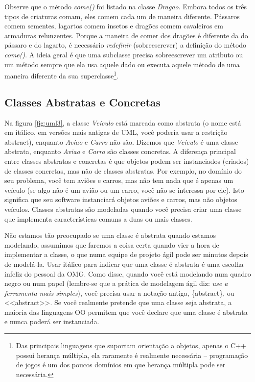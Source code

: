 \documentclass[
	article,			%
	12pt,				%
	openright,
	twoside,			%
	a4paper,			%
	english,			%
	french,
	brazil,				%
	sumario=tradicional
	]{abntex2}
\begin{document}
Observe que o método \emph{come()} foi listado na classe \emph{Dragao}. Embora todos os três tipos de criaturas comam, eles comem cada um de maneira diferente. Pássaros comem sementes, lagartos comem insetos e dragões comem cavaleiros em armaduras relunzentes. Porque a maneira de comer dos dragões é diferente da do pássaro e do lagarto, é necessário \textit{redefinir} (sobreescrever) a definição do método \emph{come()}. A ideia geral é que uma subclasse precisa sobreescrever um atributo ou um método sempre que ela usa aquele dado ou executa aquele método de uma maneira diferente da sua superclasse\footnote{Das principais linguagens que suportam orientação a objetos, apenas o C++ possui herança múltipla, ela raramente é realmente necessária -- programação de jogos é um dos poucos domínios em que herança múltipla pode ser necessária.}.

\subsection{Classes Abstratas e Concretas}

Na figura \ref{fig:uml3}, a classe \emph{Veiculo} está marcada como abstrata (o nome está em itálico, em versões mais antigas de UML, você poderia usar a restrição {abstract}), enquanto \emph{Aviao} e \emph{Carro} não são. Dizemos que 
\emph{Veiculo} é uma classe abstrata, enquanto \emph{Aviao} e \emph{Carro} são classes concretas. A diferença principal entre classes abstratas e concretas é que objetos podem ser instanciados (criados) de classes concretas, mas não de classes abstratas. Por exemplo, no domínio do seu problema, você tem aviões e carros, mas não tem nada que é apenas um veículo (se algo não é um avião ou um carro, você não se interessa por ele). Isto significa que seu software instanciará objetos aviões e carros, mas não objetos veículos. Classes abstratas são modeladas quando você precisa criar uma classe que implementa características comuns a duas ou mais classes.

Não estamos tão preocupado se uma classe é abstrata quando estamos modelando, assumimos que faremos a coisa certa quando vier a hora de implementar a classe, o que numa equipe de projeto ágil pode ser minutos depois de modelá-la. Usar itálico para indicar que uma classe é abstrata é uma escolha infeliz do pessoal da OMG. Como  disse, quando você está modelando num quadro negro ou num papel (lembre-se que a prática de modelagem ágil diz: \textit{use a ferramenta mais simples}), você precisa usar a notação antiga, \{abstract\}, ou <<abstract>>. Se você realmente pretende que uma classe seja abstrata, a maioria das linguagens OO permitem que você declare que uma classe é abstrata e nunca poderá ser instanciada.
\end{document}
